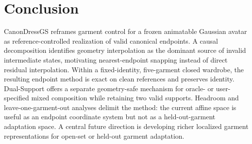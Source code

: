 \section{Conclusion}

CanonDressGS reframes garment control for a frozen animatable Gaussian avatar as reference-controlled realization of valid canonical endpoints. A causal decomposition identifies geometry interpolation as the dominant source of invalid intermediate states, motivating nearest-endpoint snapping instead of direct residual interpolation. Within a fixed-identity, five-garment closed wardrobe, the resulting endpoint method is exact on clean references and preserves identity. Dual-Support offers a separate geometry-safe mechanism for oracle- or user-specified mixed composition while retaining two valid supports. Headroom and leave-one-garment-out analyses delimit the method: the current affine space is useful as an endpoint coordinate system but not as a held-out-garment adaptation space. A central future direction is developing richer localized garment representations for open-set or held-out garment adaptation.
